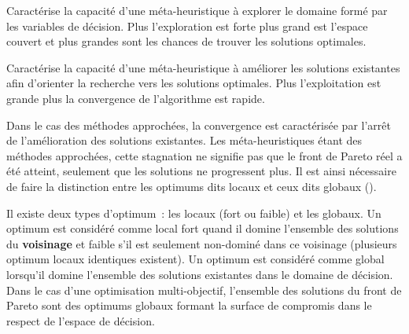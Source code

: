 \begin{Def}[Exploration]\label{def:exploration}
Caractérise la capacité d’une méta-heuristique à explorer le domaine formé par les
variables de décision. Plus l’exploration est forte plus grand est l’espace couvert
et plus grandes sont les chances de trouver les solutions optimales.
\end{Def}

\begin{Def}[Exploitation]\label{def:exploitation}
Caractérise la capacité d’une méta-heuristique à améliorer les solutions existantes
afin d’orienter la recherche vers les solutions optimales. Plus l’exploitation est
grande plus la convergence de l’algorithme est rapide.
\end{Def}

\begin{Def}[Convergence]\label{def:convergence}
Dans le cas des méthodes approchées, la convergence est caractérisée par l’arrêt
de l’amélioration des solutions existantes. Les méta-heuristiques étant des
méthodes approchées, cette stagnation ne signifie pas que le front de Pareto réel
a été atteint, seulement que les solutions ne progressent plus. Il est ainsi
nécessaire de faire la distinction entre les optimums dits locaux et ceux dits
globaux ().
\end{Def}

\begin{Def}\label{def:optimum}
Il existe deux types d’optimum~: les locaux (fort ou faible) et les globaux. Un
optimum est considéré comme local fort quand il domine l’ensemble des solutions du
\textbf{voisinage} et faible s’il est seulement non-dominé dans ce voisinage (plusieurs
optimum locaux identiques existent). Un optimum est considéré comme global
lorsqu’il domine l’ensemble des solutions existantes dans le domaine de
décision. Dans le cas d’une optimisation multi-objectif, l’ensemble des
solutions du front de Pareto sont des optimums globaux formant la surface de
compromis dans le respect de l’espace de décision.
\end{Def}

